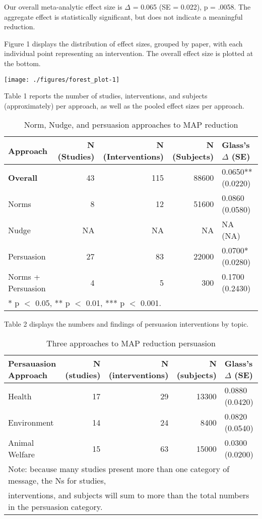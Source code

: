 \documentclass[sn-nature,pdflatex]{sn-jnl}
\begin{document}
Our overall meta-analytic effect size is \(\Delta\) = 0.065 (SE =
0.022), p = .0058. The aggregate effect is statistically significant,
but does not indicate a meaningful reduction.

Figure 1 displays the distribution of effect sizes, grouped by paper,
with each individual point representing an intervention. The overall
effect size is plotted at the bottom.

\texttt{[image: ./figures/forest\_plot-1]}

Table 1 reports the number of studies, interventions, and subjects
(approximately) per approach, as well as the pooled effect sizes per
approach.

\begin{table}[!h]
\centering
\caption{\label{tab:table_one}Norm, Nudge, and persuasion approaches to MAP reduction}
\centering
\begin{tabular}[t]{lrrrl}
\toprule
Approach & N (Studies) & N (Interventions) & N (Subjects) & Glass's $\Delta$ (SE)\\
\midrule
\textbf{Overall} & 43 & 115 & 88600 & 0.0650** (0.0220)\\
Norms & 8 & 12 & 51600 & 0.0860 (0.0580)\\
Nudge & NA & NA & NA & NA (NA)\\
Persuasion & 27 & 83 & 22000 & 0.0700* (0.0280)\\
Norms + Persuasion & 4 & 5 & 300 & 0.1700 (0.2430)\\
\bottomrule
\multicolumn{5}{l}{\rule{0pt}{1em}* p $<$ 0.05, ** p $<$ 0.01, *** p $<$ 0.001.}\\
\end{tabular}
\end{table}

Table 2 displays the numbers and findings of persuasion interventions by
topic.

\begin{table}[!h]
\centering
\caption{\label{tab:table_two}Three approaches to MAP reduction persuasion}
\centering
\begin{tabular}[t]{lrrrl}
\toprule
Persauasion Approach & N (studies) & N (interventions) & N (subjects) & Glass's $\Delta$ (SE)\\
\midrule
Health & 17 & 29 & 13300 & 0.0880 (0.0420)\\
Environment & 14 & 24 & 8400 & 0.0820 (0.0540)\\
Animal Welfare & 15 & 63 & 15000 & 0.0300 (0.0200)\\
\bottomrule
\multicolumn{5}{l}{\textsuperscript{} Note: because many studies present more than one category of message, the Ns for studies, \linebreak}\\
\multicolumn{5}{l}{interventions, and subjects will sum to more than the total numbers in the persuasion category.}\\
\end{tabular}
\end{table}
\end{document}
